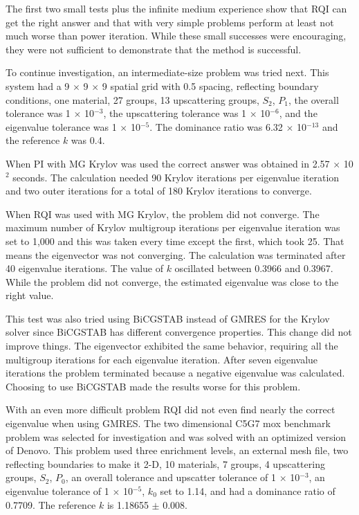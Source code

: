 The first two small tests plus the infinite medium experience show that RQI can get the right answer and that with very simple problems perform at least not much worse than power iteration. While these small successes were encouraging, they were not sufficient to demonstrate that the method is successful. 

To continue investigation, an intermediate-size problem was tried next. This system had a 9 $\times$ 9 $\times$ 9 spatial grid with 0.5 spacing, reflecting boundary conditions, one material, 27 groups, 13 upscattering groups, $S_{2}$, $P_{1}$, the overall tolerance was 1 $\times$ 10$^{-3}$, the upscattering tolerance was 1 $\times$ 10$^{-6}$, and the eigenvalue tolerance was 1 $\times$ 10$^{-5}$. The dominance ratio was 6.32 $\times$ 10$^{-13}$ and the reference $k$ was 0.4. 

When PI with MG Krylov was used the correct answer was obtained in 2.57 $\times$ 10$^{2}$ seconds. The calculation needed 90 Krylov iterations per eigenvalue iteration and two outer iterations for a total of 180 Krylov iterations to converge. 

When RQI was used with MG Krylov, the problem did not converge. The maximum number of Krylov multigroup iterations per eigenvalue iteration was set to 1,000 and this was taken every time except the first, which took 25. That means the eigenvector was not converging. The calculation was terminated after 40 eigenvalue iterations. The value of $k$ oscillated between 0.3966 and 0.3967. While the problem did not converge, the estimated eigenvalue was close to the right value.

This test was also tried using BiCGSTAB instead of GMRES for the Krylov solver since BiCGSTAB has different convergence properties. This change did not improve things. The eigenvector exhibited the same behavior, requiring all the multigroup iterations for each eigenvalue iteration. After seven eigenvalue iterations the problem terminated because a negative eigenvalue was calculated. Choosing to use BiCGSTAB made the results worse for this problem. 

With an even more difficult problem RQI did not even find nearly the correct eigenvalue when using GMRES. The two dimensional C5G7 mox benchmark problem \cite{OECD-NEA2003} was selected for investigation and was solved with an optimized version of Denovo. This problem used three enrichment levels, an external mesh file, two reflecting boundaries to make it 2-D, 10 materials, 7 groups, 4 upscattering groups, $S_{2}$, $P_{0}$, an overall tolerance and upscatter tolerance of 1 $\times$ 10$^{-3}$, an eigenvalue tolerance of 1 $\times$ 10$^{-5}$, $k_{0}$ set to 1.14, and had a dominance ratio of 0.7709. The reference $k$ is 1.18655 $\pm$ 0.008.

